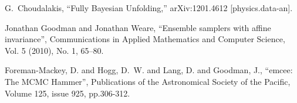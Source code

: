 \documentclass[12pt]{article}
\begin{document}
\begin{thebibliography}{99}
  G.~Choudalakis,
  ``Fully Bayesian Unfolding,''
  arXiv:1201.4612 [physics.data-an].

  Jonathan Goodman and Jonathan Weare,
  ``Ensemble samplers with affine invariance'',
  Communications in Applied Mathematics and Computer Science,
  Vol. 5 (2010), No. 1, 65–80.

Foreman-Mackey, D. and Hogg, D.~W. and {Lang}, D. and {Goodman}, J.,
``emcee: The MCMC Hammer'',
Publications of the Astronomical Society of the Pacific, Volume 125, issue 925, pp.306-312.


\end{thebibliography}
\end{document}
